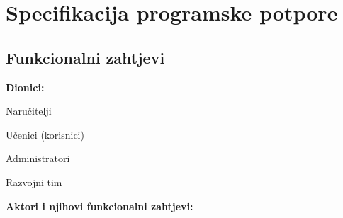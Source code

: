 \chapter{Specifikacija programske potpore}
		
	\section{Funkcionalni zahtjevi}
			
			\noindent \textbf{Dionici:}
			
			\begin{packed_enum}
				
				\item Naručitelji
				\item Učenici (korisnici)
				\item Administratori				
				\item Razvojni tim
				
			\end{packed_enum}
			
			\noindent \textbf{Aktori i njihovi funkcionalni zahtjevi:}
			
